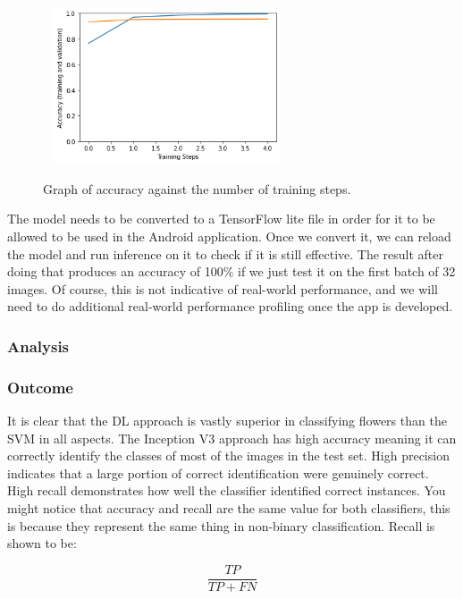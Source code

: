 \documentclass{article}
\begin{document}
\begin{figure}[h]\
    \centering
    \includegraphics[width=0.6\textwidth]{inception_acc.png}
    \caption{Graph of accuracy against the number of training steps.}
    \label{fig:incep_acc}
\end{figure}

The model needs to be converted to a TensorFlow lite file in order for it to be allowed to be used in the Android 
application. Once we convert it, we can reload the model and run inference on it to check if it is still effective. The 
result after doing that produces an accuracy of 100\% if we just test it on the first batch of 32 images. Of course, 
this is not indicative of real-world performance, and we will need to do additional real-world performance profiling 
once the app is developed. 

\subsubsection{Analysis}

\subsubsection*{Outcome}

It is clear that the DL approach is vastly superior in classifying flowers than the SVM in all aspects. The Inception V3
approach has high accuracy meaning it can correctly identify the classes of most of the images in the test set. 
High precision indicates that a large portion of correct identification were genuinely correct. High recall demonstrates
how well the classifier identified correct instances. You might notice that accuracy and recall are the same value for 
both classifiers, this is because they represent the same thing in non-binary classification. Recall is shown to be:

\begin{equation}
    \frac{TP}{TP+FN}
\end{equation}
\end{document}
